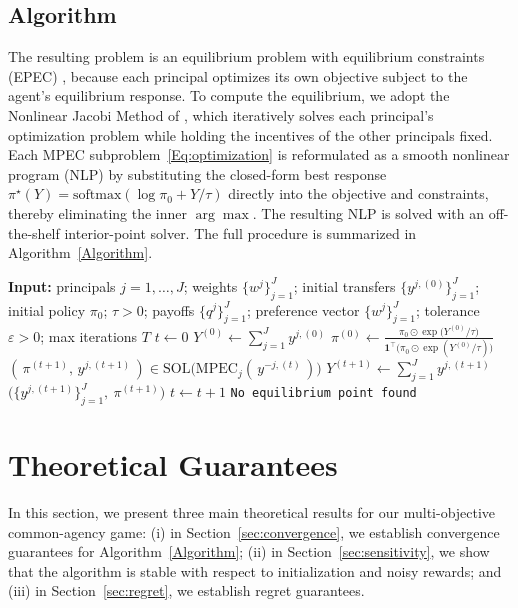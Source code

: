 \documentclass{article}
\begin{document}
\subsection{Algorithm}
The resulting problem is an equilibrium problem with equilibrium constraints (EPEC) \citep{su2005equilibrium}, because each principal optimizes its own objective subject to the agent's equilibrium response. To compute the equilibrium, we adopt the Nonlinear Jacobi Method of \citep{su2005equilibrium}, which iteratively solves each principal's optimization problem while holding the incentives of the other principals fixed.
Each MPEC subproblem~\eqref{Eq:optimization} is reformulated as a smooth nonlinear program (NLP) by substituting the closed-form best response \(\pi^\star(Y)=\mathrm{softmax}(\log\pi_0+Y/\tau)\) directly into the objective and constraints, thereby eliminating the inner \(\arg\max\). The resulting NLP is solved with an off-the-shelf interior-point solver. The full procedure is summarized in Algorithm~\ref{Algorithm}.


\begin{algorithm}
\caption{Nonlinear Jacobi Method for Common-Agency EPEC}\label{Algorithm}
\begin{algorithmic}[1]
\State \textbf{Input:} principals $j=1,\dots,J$; weights $\{w^j\}_{j=1}^J$; initial transfers $\{y^{j,(0)}\}_{j=1}^J$; initial policy $\pi_0$; $\tau>0$; payoffs $\{q^j\}_{j=1}^J$; preference vector $\{w^j\}_{j=1}^J$; tolerance $\varepsilon>0$; max iterations $T$
\State $t \gets 0$
\State $Y^{(0)} \gets \sum_{j=1}^J y^{j,(0)}$
\State $\displaystyle \pi^{(0)} \gets \frac{\pi_0 \odot \exp\!\big(Y^{(0)}/\tau\big)}{\mathbf{1}^\top\!\big(\pi_0 \odot \exp(Y^{(0)}/\tau)\big)}$ 
   
    \State $(\,\pi^{(t+1)},\, y^{j,(t+1)}\,) \in \mathrm{SOL}\big(\mathrm{MPEC}_j(\,y^{-\!j,(t)}\,)\big)$
  \EndFor
  \State $Y^{(t+1)} \gets \sum_{j=1}^J y^{j,(t+1)}$ 
    \State \Return $\big(\{y^{j,(t+1)}\}_{j=1}^J,\ \pi^{(t+1)}\big)$
  \EndIf
  \State $t \gets t+1$
\EndWhile
\State \Return \texttt{No equilibrium point found}
\end{algorithmic}
\end{algorithm}


\section{Theoretical Guarantees}
\label{sec:theory}
In this section, we present three main theoretical results for our multi-objective common-agency game: (i) in Section~\ref{sec:convergence}, we establish convergence guarantees for Algorithm~\ref{Algorithm}; (ii) in Section~\ref{sec:sensitivity}, we show that the algorithm is stable with respect to initialization and noisy rewards; and (iii) in Section~\ref{sec:regret}, we establish regret guarantees.
\end{document}
